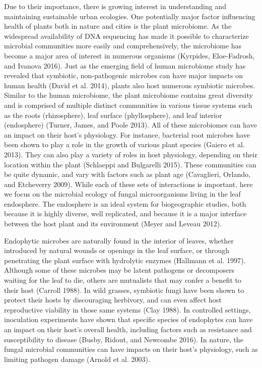 \documentclass[fleqn,10pt,lineno]{wlpeerj} %
\begin{document}
Due to their importance, there is growing interest in understanding and maintaining sustainable urban ecologies. One potentially major factor influencing health of plants both in nature and cities is the plant microbiome. As the widespread availability of DNA sequencing has made it possible to characterize microbial communities more easily and comprehensively, the microbiome has become a major area of interest in numerous organisms (Kyrpides, Eloe-Fadrosh, and Ivanova 2016). Just as the emerging field of human microbiome study has revealed that symbiotic, non-pathogenic microbes can have major impacts on human health (David et al. 2014), plants also host numerous symbiotic microbes. Similar to the human microbiome, the plant microbiome contains great diversity and is comprised of multiple distinct communities in various tissue systems such as the roots (rhizosphere), leaf surface (phyllosphere), and leaf interior (endosphere) (Turner, James, and Poole 2013). All of these microbiomes can have an impact on their host's physiology. For instance, bacterial root microbes have been shown to play a role in the growth of various plant species (Gaiero et al. 2013). They can also play a variety of roles in host physiology, depending on their location within the plant (Schlaeppi and Bulgarelli 2015). These communities can be quite dynamic, and vary with factors such as plant age (Cavaglieri, Orlando, and Etcheverry 2009). While each of these sets of interactions is important, here we focus on the microbial ecology of fungal microorganisms living in the leaf endosphere. The endosphere is an ideal system for biogeographic studies, both because it is highly diverse, well replicated, and because it is a major interface between the host plant and its environment (Meyer and Leveau 2012).

Endophytic microbes are naturally found in the interior of leaves, whether introduced by natural wounds or openings in the leaf surface, or through penetrating the plant surface with hydrolytic enzymes (Hallmann et al. 1997). Although some of these microbes may be latent pathogens or decomposers waiting for the leaf to die, others are mutualists that may confer a benefit to their host (Carroll 1988). In wild grasses, symbiotic fungi have been shown to protect their hosts by discouraging herbivory, and can even affect host reproductive viability in those same systems (Clay 1988). In controlled settings, inoculation experiments have shown that specific species of endophytes can have an impact on their host's overall health, including factors such as resistance and susceptibility to disease (Busby, Ridout, and Newcombe 2016). In nature, the fungal microbial communities can have impacts on their host's physiology, such as limiting pathogen damage (Arnold et al. 2003).
\end{document}
